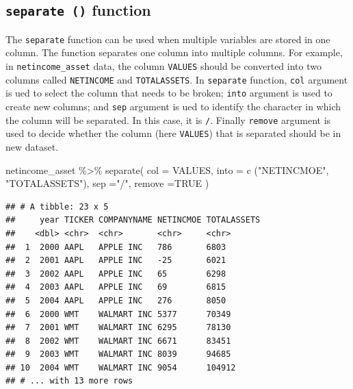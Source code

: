 \documentclass[
]{book}
\newenvironment{Shaded}{\begin{snugshade}}{\end{snugshade}}
\newcommand{\AttributeTok}[1]{\textcolor[rgb]{0.77,0.63,0.00}{#1}}
\newcommand{\ConstantTok}[1]{\textcolor[rgb]{0.00,0.00,0.00}{#1}}
\newcommand{\FunctionTok}[1]{\textcolor[rgb]{0.00,0.00,0.00}{#1}}
\newcommand{\NormalTok}[1]{#1}
\newcommand{\SpecialCharTok}[1]{\textcolor[rgb]{0.00,0.00,0.00}{#1}}
\newcommand{\StringTok}[1]{\textcolor[rgb]{0.31,0.60,0.02}{#1}}
\begin{document}
\hypertarget{separate-function}{%
\subsection{\texorpdfstring{\texttt{separate\ ()} function}{separate () function}}\label{separate-function}}

The \texttt{separate} function can be used when multiple variables are stored in one column. The function separates one column into multiple columns. For example, in \texttt{netincome\_asset} data, the column \texttt{VALUES} should be converted into two columns called \texttt{NETINCOME} and \texttt{TOTALASSETS}. In \texttt{separate} function, \texttt{col} argument is ued to select the column that needs to be broken; \texttt{into} argument is used to create new columns; and \texttt{sep} argument is ued to identify the character in which the column will be separated. In this case, it is \texttt{/}. Finally \texttt{remove} argument is used to decide whether the column (here \texttt{VALUES}) that is separated should be in new dataset.

\begin{Shaded}
\begin{Highlighting}[]
\NormalTok{netincome\_asset }\SpecialCharTok{\%\textgreater{}\%} 
  \FunctionTok{separate}\NormalTok{(}
    \AttributeTok{col =}\NormalTok{ VALUES, }\AttributeTok{into =} \FunctionTok{c}\NormalTok{ (}\StringTok{"NETINCMOE"}\NormalTok{, }\StringTok{"TOTALASSETS"}\NormalTok{), }\AttributeTok{sep =}\StringTok{"/"}\NormalTok{,}
    \AttributeTok{remove =}\ConstantTok{TRUE}
\NormalTok{  )}
\end{Highlighting}
\end{Shaded}

\begin{verbatim}
## # A tibble: 23 x 5
##     year TICKER COMPANYNAME NETINCMOE TOTALASSETS
##    <dbl> <chr>  <chr>       <chr>     <chr>      
##  1  2000 AAPL   APPLE INC   786       6803       
##  2  2001 AAPL   APPLE INC   -25       6021       
##  3  2002 AAPL   APPLE INC   65        6298       
##  4  2003 AAPL   APPLE INC   69        6815       
##  5  2004 AAPL   APPLE INC   276       8050       
##  6  2000 WMT    WALMART INC 5377      70349      
##  7  2001 WMT    WALMART INC 6295      78130      
##  8  2002 WMT    WALMART INC 6671      83451      
##  9  2003 WMT    WALMART INC 8039      94685      
## 10  2004 WMT    WALMART INC 9054      104912     
## # ... with 13 more rows
\end{verbatim}
\end{document}
